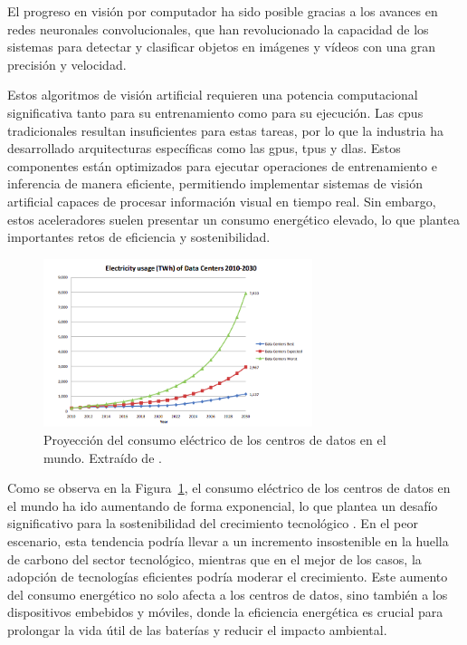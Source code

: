 \documentclass[11pt,spanish,listoffigures,listoftables]{tfgetsinf}
\begin{document}
El progreso en visión por computador ha sido posible gracias a los avances en redes neuronales convolucionales, que han revolucionado la capacidad de los sistemas para detectar y clasificar objetos en imágenes y vídeos con una gran precisión y velocidad.

Estos algoritmos de visión artificial requieren una potencia computacional significativa tanto para su entrenamiento como para su ejecución. Las \glspl{cpu} tradicionales resultan insuficientes para estas tareas, por lo que la industria ha desarrollado arquitecturas específicas como las \glspl{gpu}\cite[cap. ~3, pp. ~2-7]{hwu2022programming}, \glspl{tpu}\cite{google2025tpu} y \glspl{dla}\cite{nvidia_dla}. Estos componentes están optimizados para ejecutar operaciones de entrenamiento e inferencia de manera eficiente, permitiendo implementar sistemas de visión artificial capaces de procesar información visual en tiempo real. Sin embargo, estos aceleradores suelen presentar un consumo energético elevado, lo que plantea importantes retos de eficiencia y sostenibilidad.



\begin{figure}[H]
   \centering
   \includegraphics[width=0.7\textwidth]{images/introduccion/consumo_electrico_datacenters.png}
   \caption[Proyección del consumo eléctrico de los centros de datos en el mundo]{Proyección del consumo eléctrico de los centros de datos en el mundo. Extraído de \cite[fig. 4, p. ~17]{challe6010117}.}
\label{fig:consumo_electrico_datacenters}
\end{figure}

Como se observa en la Figura~\ref{fig:consumo_electrico_datacenters}, el consumo eléctrico de los centros de datos en el mundo ha ido aumentando de forma exponencial, lo que plantea un desafío significativo para la sostenibilidad del crecimiento tecnológico \cite{challe6010117}. En el peor escenario, esta tendencia podría llevar a un incremento insostenible en la huella de carbono del sector tecnológico, mientras que en el mejor de los casos, la adopción de tecnologías eficientes podría moderar el crecimiento. Este aumento del consumo energético no solo afecta a los centros de datos, sino también a los dispositivos embebidos y móviles, donde la eficiencia energética es crucial para prolongar la vida útil de las baterías y reducir el impacto ambiental.
\end{document}

